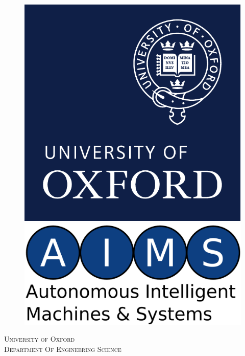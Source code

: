 \documentclass[12pt]{llncs}
\begin{document}
\begin{titlepage}
	\enlargethispage{\footskip}
	\setlength{\parindent}{0pt}
	
	\begin{figure}[t]
		\centering
		\includegraphics[scale=0.3]{ox_brand_cmyk_pos-eps-converted-to.pdf}%
		\hspace{0.3cm}
		\includegraphics[scale=0.3]{aims-logo.pdf}
	\end{figure}   
	
	\begin{center}
		\onehalfspacing
		\large
		\textsc{University of Oxford}\\
		\textsc{Department Of Engineering Science}
		
		\vspace{5mm}
		

\end{center}
\end{titlepage}
\end{document}
